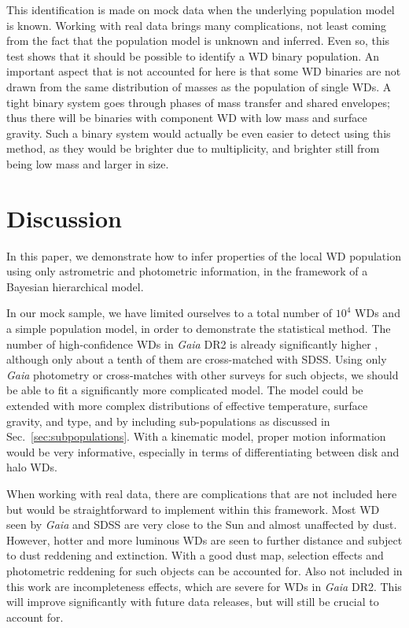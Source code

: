 \documentclass[fleqn,usenatbib]{mnras}
\begin{document}
This identification is made on mock data when the underlying population model is known. Working with real data brings many complications, not least coming from the fact that the population model is unknown and inferred. Even so, this test shows that it should be possible to identify a WD binary population. An important aspect that is not accounted for here is that some WD binaries are not drawn from the same distribution of masses as the population of single WDs. A tight binary system goes through phases of mass transfer and shared envelopes; thus there will be binaries with component WD with low mass and surface gravity. Such a binary system would actually be even easier to detect using this method, as they would be brighter due to multiplicity, and brighter still from being low mass and larger in size.







\section{Discussion}\label{sec:discussion}

In this paper, we demonstrate how to infer properties of the local WD population using only astrometric and photometric information, in the framework of a Bayesian hierarchical model.

In our mock sample, we have limited ourselves to a total number of $10^4$ WDs and a simple population model, in order to demonstrate the statistical method. The number of high-confidence WDs in \emph{Gaia} DR2 is already significantly higher \citep[roughly 260,000 in][]{2018arXiv180703315G}, although only about a tenth of them are cross-matched with SDSS. Using only \emph{Gaia} photometry or cross-matches with other surveys for such objects, we should be able to fit a significantly more complicated model. The model could be extended with more complex distributions of effective temperature, surface gravity, and type, and by including sub-populations as discussed in Sec.~\ref{sec:subpopulations}. With a kinematic model, proper motion information would be very informative, especially in terms of differentiating between disk and halo WDs.

When working with real data, there are complications that are not included here but would be straightforward to implement within this framework. Most WD seen by \emph{Gaia} and SDSS are very close to the Sun and almost unaffected by dust. However, hotter and more luminous WDs are seen to further distance and subject to dust reddening and extinction. With a good dust map, selection effects and photometric reddening for such objects can be accounted for. Also not included in this work are incompleteness effects, which are severe for WDs in \emph{Gaia} DR2. This will improve significantly with future data releases, but will still be crucial to account for.
\end{document}
